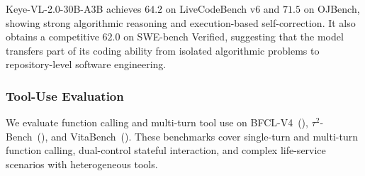 \documentclass{article} %
\begin{document}
\begin{table}[t]
\centering
\caption{Code agent evaluation of Keye-VL-2.0-30B-A3B against representative baselines. \textbf{Bold} marks the best result per row, \underline{underline} marks the second-best, and ``--'' indicates an unavailable comparable score.}
\label{tab:code_agent_eval}
\setlength{\tabcolsep}{3pt}
\renewcommand{\arraystretch}{1.15}
\end{table}

Keye-VL-2.0-30B-A3B achieves $64.2$ on LiveCodeBench v6 and $71.5$ on OJBench, showing strong algorithmic reasoning and execution-based self-correction. It also obtains a competitive $62.0$ on SWE-bench Verified, suggesting that the model transfers part of its coding ability from isolated algorithmic problems to repository-level software engineering.

\subsubsection{Tool-Use Evaluation}

We evaluate function calling and multi-turn tool use on BFCL-V4~(\cite{bfcl}), $\tau^2$-Bench~(\cite{tau2bench}), and VitaBench~(\cite{vitabench}). These benchmarks cover single-turn and multi-turn function calling, dual-control stateful interaction, and complex life-service scenarios with heterogeneous tools.
\end{document}
